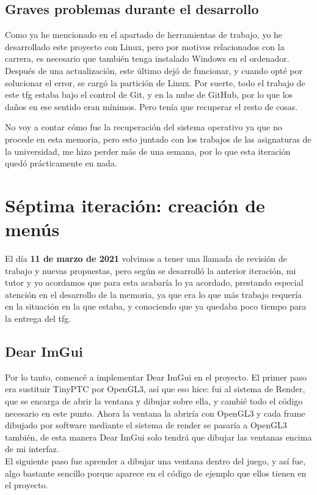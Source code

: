 \subsection{Graves problemas durante el desarrollo}
Como ya he mencionado en el apartado de herramientas de trabajo, yo he desarrollado este proyecto con Linux, pero por motivos relacionados con la carrera, es necesario que también tenga instalado Windows en el ordenador. Después de una actualización, este último dejó de funcionar, y cuando opté por solucionar el error, se cargó la partición de Linux. Por suerte, todo el trabajo de este \gls{tfg} estaba bajo el control de Git, y en la nube de GitHub, por lo que los daños en ese sentido eran mínimos. Pero tenía que recuperar el resto de cosas.

No voy a contar cómo fue la recuperación del sistema operativo ya que no procede en esta memoria, pero esto juntado con los trabajos de las asignaturas de la universidad, me hizo perder más de una semana, por lo que esta iteración quedó prácticamente en nada.

\section{Séptima iteración: creación de menús}
El día \textbf{11 de marzo de 2021} volvimos a tener una llamada de revisión de trabajo y nuevas propuestas, pero según se desarrolló la anterior iteración, mi tutor y yo acordamos que para esta acabaría lo ya acordado, prestando especial atención en el desarrollo de la memoria, ya que era lo que más trabajo requería en la situación en la que estaba, y conociendo que ya quedaba poco tiempo para la entrega del \gls{tfg}.

\subsection{Dear ImGui}
Por lo tanto, comencé a implementar Dear ImGui en el proyecto. El primer paso era sustituir TinyPTC por OpenGL3, así que eso hice: fui al sistema de Render, que se encarga de abrir la ventana y dibujar sobre ella, y cambié todo el código necesario en este punto. Ahora la ventana la abriría con OpenGL3 y cada frame dibujado por software mediante el sistema de render se pasaría a OpenGL3 también, de esta manera Dear ImGui solo tendrá que dibujar las ventanas encima de mi interfaz.
\\
El siguiente paso fue aprender a dibujar una ventana dentro del juego, y así fue, algo bastante sencillo porque aparece en el código de ejemplo que ellos tienen en el proyecto.

